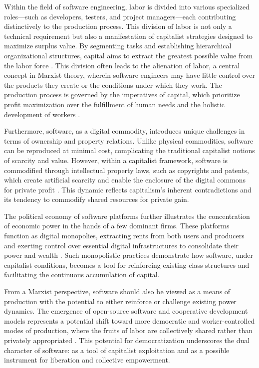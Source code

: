 \begin{refsection}
Within the field of software engineering, labor is divided into various specialized roles—such as developers, testers, and project managers—each contributing distinctively to the production process. This division of labor is not only a technical requirement but also a manifestation of capitalist strategies designed to maximize surplus value. By segmenting tasks and establishing hierarchical organizational structures, capital aims to extract the greatest possible value from the labor force \cite[pp.~1-10]{fuchs2014digital}. This division often leads to the alienation of labor, a central concept in Marxist theory, wherein software engineers may have little control over the products they create or the conditions under which they work. The production process is governed by the imperatives of capital, which prioritize profit maximization over the fulfillment of human needs and the holistic development of workers \cite[pp.~799-800]{marx2008capital}.

Furthermore, software, as a digital commodity, introduces unique challenges in terms of ownership and property relations. Unlike physical commodities, software can be reproduced at minimal cost, complicating the traditional capitalist notions of scarcity and value. However, within a capitalist framework, software is commodified through intellectual property laws, such as copyrights and patents, which create artificial scarcity and enable the enclosure of the digital commons for private profit \cite[pp.~37-39]{hardt2011commonwealth}. This dynamic reflects capitalism's inherent contradictions and its tendency to commodify shared resources for private gain.

The political economy of software platforms further illustrates the concentration of economic power in the hands of a few dominant firms. These platforms function as digital monopolies, extracting rents from both users and producers and exerting control over essential digital infrastructures to consolidate their power and wealth \cite[pp.~82-84]{zuboff2020surveillance}. Such monopolistic practices demonstrate how software, under capitalist conditions, becomes a tool for reinforcing existing class structures and facilitating the continuous accumulation of capital.

From a Marxist perspective, software should also be viewed as a means of production with the potential to either reinforce or challenge existing power dynamics. The emergence of open-source software and cooperative development models represents a potential shift toward more democratic and worker-controlled modes of production, where the fruits of labor are collectively shared rather than privately appropriated \cite[pp.~106-108]{benkler2010wealth}. This potential for democratization underscores the dual character of software: as a tool of capitalist exploitation and as a possible instrument for liberation and collective empowerment.


\end{refsection}
